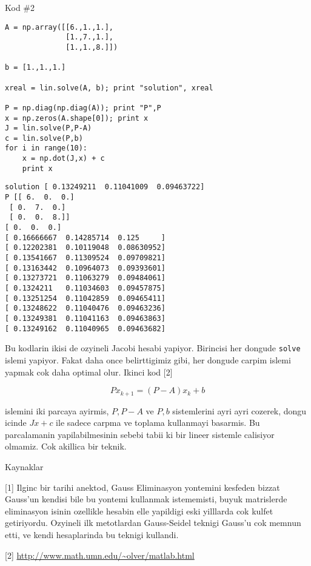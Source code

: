\documentclass[12pt,fleqn]{article}\usepackage{../common}
\begin{document}
Kod \#2

\begin{verbatim}
A = np.array([[6.,1.,1.],
              [1.,7.,1.],
              [1.,1.,8.]])

b = [1.,1.,1.]

xreal = lin.solve(A, b); print "solution", xreal

P = np.diag(np.diag(A)); print "P",P
x = np.zeros(A.shape[0]); print x
J = lin.solve(P,P-A)
c = lin.solve(P,b)
for i in range(10):
    x = np.dot(J,x) + c
    print x
\end{verbatim}

\begin{verbatim}
solution [ 0.13249211  0.11041009  0.09463722]
P [[ 6.  0.  0.]
 [ 0.  7.  0.]
 [ 0.  0.  8.]]
[ 0.  0.  0.]
[ 0.16666667  0.14285714  0.125     ]
[ 0.12202381  0.10119048  0.08630952]
[ 0.13541667  0.11309524  0.09709821]
[ 0.13163442  0.10964073  0.09393601]
[ 0.13273721  0.11063279  0.09484061]
[ 0.1324211   0.11034603  0.09457875]
[ 0.13251254  0.11042859  0.09465411]
[ 0.13248622  0.11040476  0.09463236]
[ 0.13249381  0.11041163  0.09463863]
[ 0.13249162  0.11040965  0.09463682]
\end{verbatim}

Bu kodlarin ikisi de ozyineli Jacobi hesabi yapiyor. Birincisi her dongude 
\verb!solve! islemi yapiyor. Fakat daha once belirttigimiz gibi, her
dongude carpim islemi yapmak cok daha optimal olur. Ikinci kod [2]

\[ Px_{k+1} =  (P - A)x_k + b \]

islemini iki parcaya ayirmis, $P,P-A$ ve $P,b$ sistemlerini ayri ayri
cozerek, dongu icinde $Jx + c$ ile sadece carpma ve toplama kullanmayi
basarmis. Bu parcalamanin yapilabilmesinin sebebi tabii ki bir lineer
sistemle calisiyor olmamiz. Cok akillica bir teknik. 

Kaynaklar

[1] Ilginc bir tarihi anektod, Gauss Eliminasyon yontemini kesfeden bizzat
Gauss'un kendisi bile bu yontemi kullanmak istememisti, buyuk matrislerde
eliminasyon isinin ozellikle hesabin elle yapildigi eski yilllarda cok
kulfet getiriyordu. Ozyineli ilk metotlardan Gauss-Seidel teknigi Gauss'u
cok memnun etti, ve kendi hesaplarinda bu teknigi kullandi.

[2] \url{http://www.math.umn.edu/~olver/matlab.html}
\end{document}
